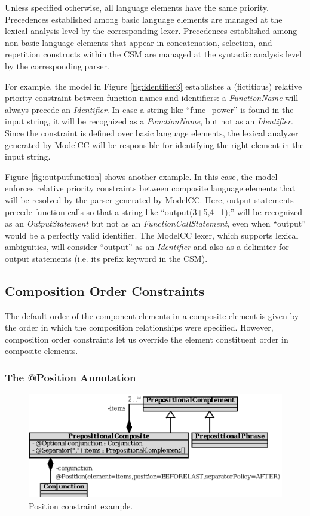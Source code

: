 \documentclass[a4paper,twoside,onecolumn]{article}
\begin{document}
Unless specified otherwise, all language elements have the same priority.
Precedences established among basic language elements are managed at the lexical analysis level by the corresponding lexer.
Precedences established among non-basic language elements that appear in concatenation, selection, and repetition constructs within the CSM are managed at the syntactic analysis level by the corresponding parser.

For example, the model in Figure \ref{fig:identifier3} establishes a (fictitious) relative priority constraint between function names and identifiers: a \emph{FunctionName} will always precede an \emph{Identifier}.
In case a string like ``func\_power'' is found in the input string, it will be recognized as a \emph{FunctionName}, but not as an \emph{Identifier}.
Since the constraint is defined over basic language elements, the lexical analyzer generated by ModelCC will be responsible for identifying the right element in the input string.

Figure \ref{fig:outputfunction} shows another example.
In this case, the model enforces relative priority constraints between composite language elements that will be resolved by the parser generated by ModelCC.
Here, output statements precede function calls so that a string like ``output(3+5,4+1);'' will be recognized as an \emph{OutputStatement} but not as an \emph{FunctionCallStatement}, even when ``output'' would be a perfectly valid identifier.
The ModelCC lexer, which supports lexical ambiguities, will consider ``output'' as an \emph{Identifier} and also as a delimiter for output statements (i.e. its prefix keyword in the CSM).

\subsection{Composition Order Constraints} \label{subsec:comporder}

The default order of the component elements in a composite element is given by the order in which the composition relationships were specified.
However, composition order constraints let us override the element constituent order in composite elements.

\subsubsection{The @Position Annotation}

\begin{figure}[tb!]
\centering
\includegraphics[scale=1]{prepositional.eps}
\caption{Position constraint example.} \label{fig:prepositional}
\end{figure}
\end{document}
